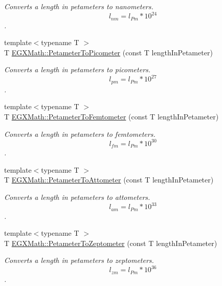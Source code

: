 \begin{DoxyCompactItemize}
\begin{DoxyCompactList}\small\item\em Converts a length in petameters to nanometers. \[ l_{nm}=l_{Pm} * 10^{24} \]. \end{DoxyCompactList}\item 
{\footnotesize template$<$typename T $>$ }\\T \mbox{\hyperlink{group___e_g_x_math-_conversions-_length_conversions-_s_i-_petameter-_s_i_ga092df775702bdd1b027e20a243d0aa75}{E\+G\+X\+Math\+::\+Petameter\+To\+Picometer}} (const T length\+In\+Petameter)
\begin{DoxyCompactList}\small\item\em Converts a length in petameters to picometers. \[ l_{pm}=l_{Pm} * 10^{27} \]. \end{DoxyCompactList}\item 
{\footnotesize template$<$typename T $>$ }\\T \mbox{\hyperlink{group___e_g_x_math-_conversions-_length_conversions-_s_i-_petameter-_s_i_ga295c384b3674727367d592d2b721fcd2}{E\+G\+X\+Math\+::\+Petameter\+To\+Femtometer}} (const T length\+In\+Petameter)
\begin{DoxyCompactList}\small\item\em Converts a length in petameters to femtometers. \[ l_{fm}=l_{Pm} * 10^{30} \]. \end{DoxyCompactList}\item 
{\footnotesize template$<$typename T $>$ }\\T \mbox{\hyperlink{group___e_g_x_math-_conversions-_length_conversions-_s_i-_petameter-_s_i_ga4803fb5abfc83b6bdb8dce9fffff8fbe}{E\+G\+X\+Math\+::\+Petameter\+To\+Attometer}} (const T length\+In\+Petameter)
\begin{DoxyCompactList}\small\item\em Converts a length in petameters to attometers. \[ l_{am}=l_{Pm} * 10^{33} \]. \end{DoxyCompactList}\item 
{\footnotesize template$<$typename T $>$ }\\T \mbox{\hyperlink{group___e_g_x_math-_conversions-_length_conversions-_s_i-_petameter-_s_i_ga8c7a1ddfa7557e65e26e65e17a9e3a45}{E\+G\+X\+Math\+::\+Petameter\+To\+Zeptometer}} (const T length\+In\+Petameter)
\begin{DoxyCompactList}\small\item\em Converts a length in petameters to zeptometers. \[ l_{zm}=l_{Pm} * 10^{36} \]. \end{DoxyCompactList}\item 

\end{DoxyCompactItemize}
